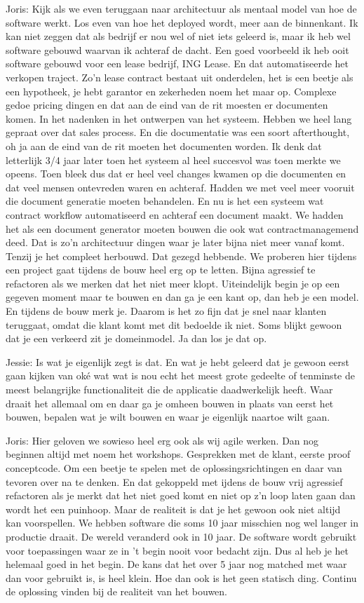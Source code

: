 Joris: Kijk als we even teruggaan naar architectuur als mentaal model van hoe de software werkt. Los even van hoe het deployed wordt, meer aan de binnenkant. Ik kan niet zeggen dat als bedrijf er nou wel of niet iets geleerd is, maar ik heb wel software gebouwd waarvan ik achteraf de dacht. Een goed voorbeeld ik heb ooit software gebouwd voor een lease bedrijf, ING Lease. En dat automatiseerde het verkopen traject. Zo'n lease contract bestaat uit onderdelen, het is een beetje als een hypotheek, je hebt garantor en zekerheden noem het maar op. Complexe gedoe pricing dingen en dat aan de eind van de rit moesten er documenten komen. In het nadenken in het ontwerpen van het systeem. Hebben we heel lang gepraat over dat sales process. En die documentatie was een soort afterthought, oh ja aan de eind van de rit moeten het documenten worden. Ik denk dat letterlijk 3/4 jaar later toen het systeem al heel succesvol was toen merkte we opeens. Toen bleek dus dat er heel veel changes kwamen op die documenten en dat veel mensen ontevreden waren en achteraf. Hadden we met veel meer vooruit die document generatie moeten behandelen. En nu is het een systeem wat contract workflow automatiseerd en achteraf een document maakt. We hadden het als een document generator moeten bouwen die ook wat contractmanagemend deed. Dat is zo'n architectuur dingen waar je later bijna niet meer vanaf komt. Tenzij je het compleet herbouwd. Dat gezegd hebbende. We proberen hier tijdens een project gaat tijdens de bouw heel erg op te letten. Bijna agressief te refactoren als we merken dat het niet meer klopt. Uiteindelijk begin je op een gegeven moment maar te bouwen en dan ga je een kant op, dan heb je een model. En tijdens de bouw merk je. Daarom is het zo fijn dat je snel naar klanten teruggaat, omdat die klant komt met dit bedoelde ik niet. Soms blijkt gewoon dat je een verkeerd zit je domeinmodel. Ja dan los je dat op.

Jessie: Is wat je eigenlijk zegt is dat. En wat je hebt geleerd dat je gewoon eerst gaan kijken van oké wat wat is nou echt het meest grote gedeelte of tenminste de meest belangrijke functionaliteit die de applicatie daadwerkelijk heeft. Waar draait het allemaal om en daar ga je omheen bouwen in plaats van eerst het bouwen, bepalen wat je wilt bouwen en waar je eigenlijk naartoe wilt gaan.

Joris: Hier geloven we sowieso heel erg  ook als wij agile werken. Dan nog beginnen altijd met noem het workshops. Gesprekken met de klant, eerste proof conceptcode. Om een beetje te spelen met de oplossingsrichtingen en daar van tevoren over na te denken. En dat gekoppeld met ijdens de bouw vrij agressief refactoren als je merkt dat het niet goed komt en niet op z'n loop laten gaan dan wordt het een puinhoop. Maar de realiteit is dat je het gewoon ook niet altijd kan voorspellen. We hebben software die soms 10 jaar misschien nog wel langer in productie draait. De wereld veranderd ook in 10 jaar. De software wordt gebruikt voor toepassingen waar ze in 't begin nooit voor bedacht zijn. Dus al heb je het helemaal goed in het begin. De kans dat het over 5 jaar nog matched met waar dan voor gebruikt is, is heel klein. Hoe dan ook is het geen statisch ding. Continu de oplossing vinden bij de realiteit van het bouwen.

